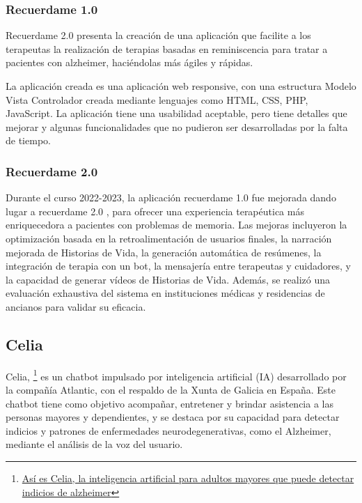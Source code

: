 \subsubsection{Recuerdame 1.0}
Recuerdame 2.0 \cite{recuerdame1.0} presenta la creación de una aplicación que facilite a los terapeutas la realización de terapias basadas en reminiscencia para tratar a pacientes con alzheimer, haciéndolas más ágiles y rápidas.

La aplicación creada es una aplicación web responsive, con una estructura Modelo Vista Controlador creada mediante lenguajes como HTML, CSS, PHP, JavaScript. La aplicación tiene una usabilidad aceptable, pero tiene detalles que mejorar y algunas funcionalidades que no pudieron ser desarrolladas por la falta de tiempo. 

\subsubsection{Recuerdame 2.0}
Durante el curso 2022-2023, la aplicación recuerdame 1.0 fue mejorada dando lugar a recuerdame 2.0 \cite{recuerdame2.0}, para ofrecer una experiencia terapéutica más enriquecedora a pacientes con problemas de memoria. Las mejoras incluyeron la optimización basada en la retroalimentación de usuarios finales, la narración mejorada de Historias de Vida, la generación automática de resúmenes, la integración de terapia con un bot, la mensajería entre terapeutas y cuidadores, y la capacidad de generar vídeos de Historias de Vida. Además, se realizó una evaluación exhaustiva del sistema en instituciones médicas y residencias de ancianos para validar su eficacia.

\subsection{Celia}

Celia, \footnote{\href{https://www.ambito.com/tecnologia/asi-es-celia-la-inteligencia-artificial-adultos-mayores-que-puede-detectar-indicios-alzheimer-n5921639}{Así es Celia, la inteligencia artificial para adultos mayores que puede detectar indicios de alzheimer}} es un chatbot impulsado por inteligencia artificial (IA) desarrollado por la compañía Atlantic, con el respaldo de la Xunta de Galicia en España. Este chatbot tiene como objetivo acompañar, entretener y brindar asistencia a las personas mayores y dependientes, y se destaca por su capacidad para detectar indicios y patrones de enfermedades neurodegenerativas, como el Alzheimer, mediante el análisis de la voz del usuario.

